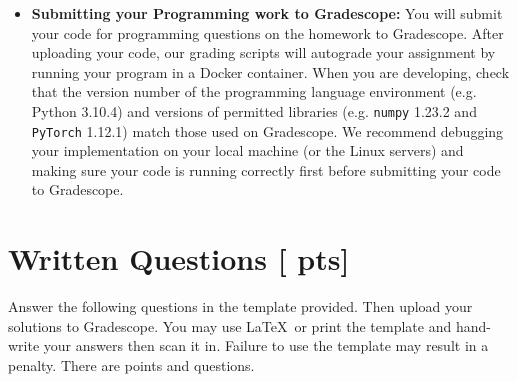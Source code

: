 \documentclass[11pt,addpoints,answers]{exam}
\numberwithin{equation}{section} %
\numberwithin{figure}{section} %
\numberwithin{table}{section} %
\newcommand{\pts}[1]{\textbf{[#1 pts]}}
\begin{document}
\begin{itemize}
\item \textbf{Submitting your Programming work to Gradescope:} You will submit your code for programming questions on the homework to Gradescope. After uploading your code, our grading scripts will autograde your assignment by running your program in a Docker container. When you are developing, check that the version number of the programming language environment (e.g. Python 3.10.4) and versions of permitted libraries (e.g.  \texttt{numpy} 1.23.2 and \texttt{PyTorch} 1.12.1) match those used on Gradescope. We recommend debugging your implementation on your local machine (or the Linux servers) and making sure your code is running correctly first before submitting your code to Gradescope.



\end{itemize}




\clearpage

%
%
\section{Written Questions \pts{\numpoints{}}}
\label{sec:warmup}
Answer the following questions in the template provided.  Then upload your solutions to Gradescope. You may use \LaTeX\ or print the template and hand-write your answers then scan it in. Failure to use the template may result in a penalty. There are \numpoints{} points and \numquestions{} questions.
\end{document}

